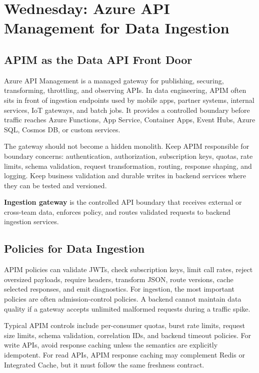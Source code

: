 \section{Wednesday: Azure API Management for Data Ingestion}

\subsection{APIM as the Data API Front Door}
Azure API Management is a managed gateway for publishing, securing, transforming, throttling, and observing APIs. In data engineering, APIM often sits in front of ingestion endpoints used by mobile apps, partner systems, internal services, IoT gateways, and batch jobs. It provides a controlled boundary before traffic reaches Azure Functions, App Service, Container Apps, Event Hubs, Azure SQL, Cosmos DB, or custom services.

The gateway should not become a hidden monolith. Keep APIM responsible for boundary concerns: authentication, authorization, subscription keys, quotas, rate limits, schema validation, request transformation, routing, response shaping, and logging. Keep business validation and durable writes in backend services where they can be tested and versioned.

\begin{definitionbox}
\textbf{Ingestion gateway} is the controlled API boundary that receives external or cross-team data, enforces policy, and routes validated requests to backend ingestion services.
\end{definitionbox}

\subsection{Policies for Data Ingestion}
APIM policies can validate JWTs, check subscription keys, limit call rates, reject oversized payloads, require headers, transform JSON, route versions, cache selected responses, and emit diagnostics. For ingestion, the most important policies are often admission-control policies. A backend cannot maintain data quality if a gateway accepts unlimited malformed requests during a traffic spike.

Typical APIM controls include per-consumer quotas, burst rate limits, request size limits, schema validation, correlation IDs, and backend timeout policies. For write APIs, avoid response caching unless the semantics are explicitly idempotent. For read APIs, APIM response caching may complement Redis or Integrated Cache, but it must follow the same freshness contract.

